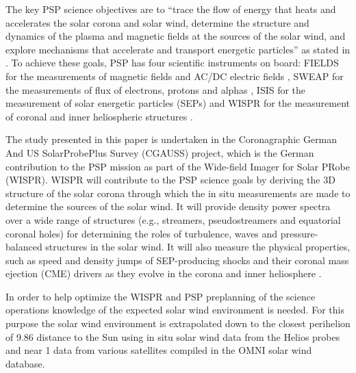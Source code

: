 The key PSP science objectives are to “trace the flow of energy that heats and accelerates the solar corona and solar wind, determine the structure and dynamics of the plasma and magnetic fields at the sources of the solar wind, and explore mechanisms that accelerate and transport energetic particles” as stated in \citet{Fox2015}. To achieve these goals, PSP has four scientific instruments on board: FIELDS for the measurements of magnetic fields and AC/DC electric fields \citep{Bale2016}, SWEAP for the measurements of flux of electrons, protons and alphas \citep{Kasper2016}, IS\sun{}IS for the measurement of solar energetic particles (SEPs) \citep{McComas2016} and WISPR for the measurement of coronal and inner heliospheric structures \citep{Vourlidas2016}.

The study presented in this paper is undertaken in the Coronagraphic German And US SolarProbePlus Survey (CGAUSS) project, which is the German contribution to the PSP mission as part of the Wide-field Imager for Solar PRobe (WISPR). WISPR will contribute to the PSP science goals by deriving the 3D structure of the solar corona through which the in situ measurements are made to determine the sources of the solar wind. It will provide density power spectra over a wide range of structures (e.g., streamers, pseudostreamers and equatorial coronal holes) for determining the roles of turbulence, waves and pressure-balanced structures in the solar wind. It will also measure the physical properties, such as speed and density jumps of SEP-producing shocks and their coronal mass ejection (CME) drivers as they evolve in the corona and inner heliosphere \citep{Vourlidas2016}.

In order to help optimize the WISPR and PSP preplanning of the science operations knowledge of the expected solar wind environment is needed. For this purpose the solar wind environment is extrapolated down to the closest perihelion of \SI{9.86}{\Rs} distance to the Sun using in situ solar wind data from the Helios probes and near \SI{1}{\au} data from various satellites compiled in the OMNI solar wind database.



